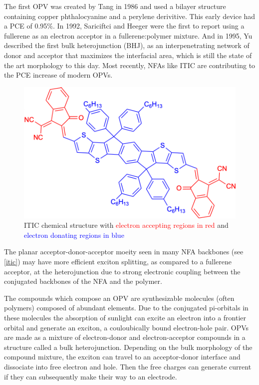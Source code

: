 The first OPV was created by Tang in 1986 and used a bilayer structure containing copper phthalocyanine and a perylene derivitive\cite{Tang1986b}. 
This early device had a PCE of 0.95\%.
In 1992, Sariciftci and Heeger were the first to report using a fullerene as an electron acceptor in a fullerene:polymer mixture\cite{Sariciftci1992}.
And in 1995, Yu described the first bulk heterojunction (BHJ), as an interpenetrating network of donor and acceptor that maximizes the interfacial area, which is still the state of the art morphology to this day\cite{Yu1995}.
Most recently, NFAs like ITIC are contributing to the PCE increase of modern OPVs\cite{S.Gurney2019b}.

\begin{figure}
    \centering
    \includegraphics[width=\linewidth]{images/ITIC.pdf}
    \caption{ITIC chemical structure with \textcolor{red}{electron accepting regions in red} and \textcolor{blue}{electron donating regions in blue}}\label{itic}
\end{figure}

\noindent The planar acceptor-donor-acceptor moeity seen in many NFA backbones (see \autoref{itic}) may have more efficient exciton splitting, as compared to a fullerene acceptor, at the heterojunction due to strong electronic coupling between the conjugated backbones of the NFA and the polymer\cite{Yi2018a}.

The compounds which compose an OPV are synthesizable molecules (often polymers) composed of abundant elements.
Due to the conjugated pi-orbitals in these molecules the absorption of sunlight can excite an electron into a frontier orbital and generate an exciton, a couloubically bound electron-hole pair.
OPVs are made as a mixture of electron-donor and electron-acceptor compounds in a structure called a bulk heterojunction.
Depending on the bulk morphology of the compound mixture, the exciton can travel to an acceptor-donor interface and dissociate into free electron and hole.
Then the free charges can generate current if they can subsequently make their way to an electrode.

